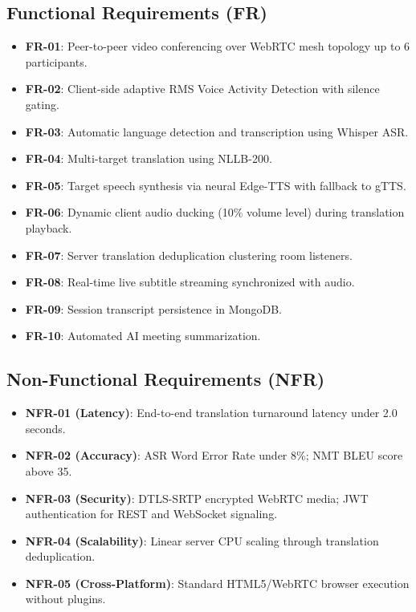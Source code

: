 \documentclass[12pt,a4paper]{report}
\begin{document}
\subsection{Functional Requirements (FR)}
\begin{itemize}
    \item \textbf{FR-01}: Peer-to-peer video conferencing over WebRTC mesh topology up to 6 participants.
    \item \textbf{FR-02}: Client-side adaptive RMS Voice Activity Detection with silence gating.
    \item \textbf{FR-03}: Automatic language detection and transcription using Whisper ASR.
    \item \textbf{FR-04}: Multi-target translation using NLLB-200.
    \item \textbf{FR-05}: Target speech synthesis via neural Edge-TTS with fallback to gTTS.
    \item \textbf{FR-06}: Dynamic client audio ducking (10\% volume level) during translation playback.
    \item \textbf{FR-07}: Server translation deduplication clustering room listeners.
    \item \textbf{FR-08}: Real-time live subtitle streaming synchronized with audio.
    \item \textbf{FR-09}: Session transcript persistence in MongoDB.
    \item \textbf{FR-10}: Automated AI meeting summarization.
\end{itemize}

\subsection{Non-Functional Requirements (NFR)}
\begin{itemize}
    \item \textbf{NFR-01 (Latency)}: End-to-end translation turnaround latency under 2.0 seconds.
    \item \textbf{NFR-02 (Accuracy)}: ASR Word Error Rate under 8\%; NMT BLEU score above 35.
    \item \textbf{NFR-03 (Security)}: DTLS-SRTP encrypted WebRTC media; JWT authentication for REST and WebSocket signaling.
    \item \textbf{NFR-04 (Scalability)}: Linear server CPU scaling through translation deduplication.
    \item \textbf{NFR-05 (Cross-Platform)}: Standard HTML5/WebRTC browser execution without plugins.
\end{itemize}
\end{document}
